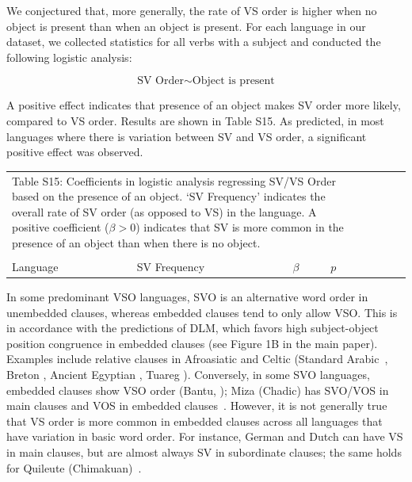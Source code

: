 \documentclass[11pt,a4paper]{article}
\begin{document}

We conjectured that, more generally, the rate of VS order is higher when no object is present than when an object is present.
For each language in our dataset, we collected statistics for all verbs with a subject and conducted the following logistic analysis:

\begin{equation}
\text{SV Order} \sim \text{Object is present}
\end{equation}

A positive effect indicates that presence of an object makes SV order more likely, compared to VS order.
Results are shown in Table S15.
As predicted, in most languages where there is variation between SV and VS order, a significant positive effect was observed.

\begin{longtable}{l|lllllll}
	\multicolumn{4}{p{0.8\textwidth}}{Table S15: Coefficients in logistic analysis regressing SV/VS Order based on the presence of an object. `SV Frequency' indicates the overall rate of SV order (as opposed to VS) in the language. A positive coefficient ($\beta > 0$) indicates that SV is more common in the presence of an object than when there is no object.}
	\\
		\multicolumn{4}{p{0.8\textwidth}}{}\\
Language & SV Frequency & $\beta$ & $p$ \\ \hline

\end{longtable}




In some predominant VSO languages, SVO is an alternative word order in unembedded clauses, whereas embedded clauses tend to only allow VSO.
This is in accordance with the predictions of DLM, which favors high subject-object position congruence in embedded clauses (see Figure 1B in the main paper).
Examples include relative clauses in Afroasiatic and Celtic (Standard Arabic~\citep{alqurashi:2012}, Breton \citep[][p. 80]{timm1988relative}, Ancient Egyptian \citep{gardiner1957egyptian}, Tuareg \citep[Chapter 12.1.2]{heath2005a}).
Conversely, in some SVO languages, embedded clauses show VSO order (Bantu, \citet{demuth1999verb}); Miza (Chadic) has SVO/VOS in main clauses and VOS in embedded clauses~\citep{wals-81}.
However, it is not generally true that VS order is more common in embedded clauses across all languages that have variation in basic word order.
For instance, German and Dutch can have VS in main clauses, but are almost always SV in subordinate clauses; the same holds for Quileute (Chimakuan)~\citep{wals-81}.
\end{document}
